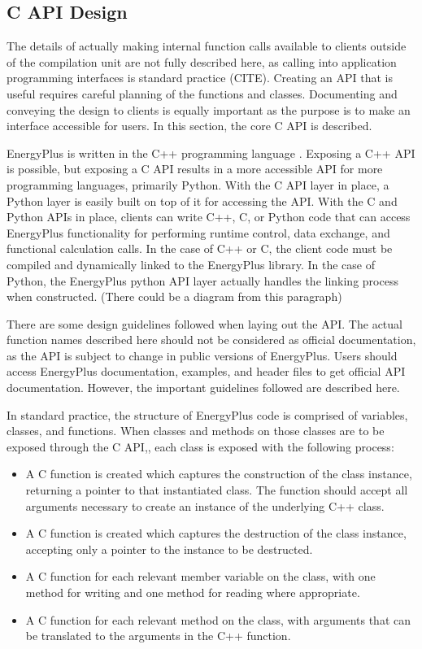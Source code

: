 \documentclass[5p, authoryear]{elsarticle}
\begin{document}
  \subsection{C API Design}
The details of actually making internal function calls available to clients outside of the compilation unit are not fully described here, as calling into application programming interfaces is standard practice (CITE).  Creating an API that is useful requires careful planning of the functions and classes.  Documenting and conveying the design to clients is equally important as the purpose is to make an interface accessible for users.  In this section, the core C API is described.

EnergyPlus is written in the C++ programming language \citep{Stroustrup1995}.  Exposing a C++ API is possible, but exposing a C API results in a more accessible API for more programming languages, primarily Python.  With the C API layer in place, a Python layer is easily built on top of it for accessing the API.  With the C and Python APIs in place, clients can write C++, C, or Python code that can access EnergyPlus functionality for performing runtime control, data exchange, and functional calculation calls.  In the case of C++ or C, the client code must be compiled and dynamically linked to the EnergyPlus library.  In the case of Python, the EnergyPlus python API layer actually handles the linking process when constructed.  (There could be a diagram from this paragraph)

There are some design guidelines followed when laying out the API.  The actual function names described here should not be considered as official documentation, as the API is subject to change in public versions of EnergyPlus.  Users should access EnergyPlus documentation, examples, and header files to get official API documentation.  However, the important guidelines followed are described here.

In standard practice, the structure of EnergyPlus code is comprised of variables, classes, and functions.  When classes and methods on those classes are to be exposed through the C API,, each class is exposed with the following process:
\begin{itemize}
 \item A C function is created which captures the construction of the class instance, returning a pointer to that instantiated class.  The function should accept all arguments necessary to create an instance of the underlying C++ class.
 \item A C function is created which captures the destruction of the class instance, accepting only a pointer to the instance to be destructed.
 \item A C function for each relevant member variable on the class, with one method for writing and one method for reading where appropriate.  
 \item A C function for each relevant method on the class, with arguments that can be translated to the arguments in the C++ function.
\end{itemize}
\end{document}
